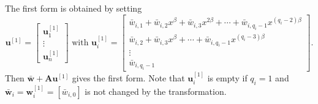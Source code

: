 \begin{pf}
The first form is obtained by setting \[
\mathbf{u}^{[1]}=\begin{bmatrix}\mathbf{u}_{1}^{[1]}\\
\vdots\\
\mathbf{u}_{n}^{[1]}\end{bmatrix}\mbox{ with }\mathbf{u}_{i}^{[1]}=\left[\begin{array}{r}
\bar{w}_{i,1}+\bar{w}_{i,2}x^{\beta}+\bar{w}_{i,3}x^{2\beta}+\cdots+\bar{w}_{i,q_{i}-1}x^{(q_{i}-2)\beta}\\
\bar{w}_{i,2}+\bar{w}_{i,3}x^{\beta}+\cdots+\bar{w}_{i,q_{i}-1}x^{(q_{i}-3)\beta}\\
\vdots~~~~~\\
\bar{w}_{i,q_{i}-1}\end{array}\right].\]
 Then $\bar{\mathbf{w}}+\mathbf{A}\mathbf{u}^{[1]}$ gives the first
form. Note that $\mathbf{u}_{i}^{[1]}$ is empty if $q_{i}=1$ and
$\bar{\mathbf{w}}_{i}=\mathbf{w}_{i}^{[1]}=[\bar{w}_{i,0}]$ is not
changed by the transformation.


\end{pf}

